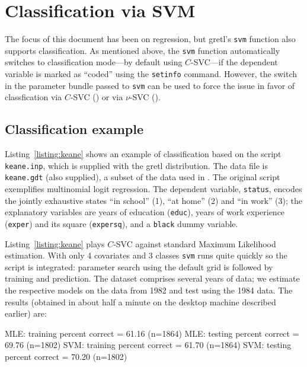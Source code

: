 \documentclass{article}
\begin{document}
\section{Classification via SVM}
\label{sec:SVC}

The focus of this document has been on regression, but gretl's
\texttt{svm} function also supports classification. As mentioned
above, the \texttt{svm} function automatically switches to
classification mode---by default using $C$-SVC---if the dependent
variable is marked as ``coded'' using the \texttt{setinfo} command.
However, the  switch in the parameter bundle passed
to \texttt{svm} can be used to force the issue in favor of
classfication via $C$-SVC () or via $\nu$-SVC
().

\subsection{Classification example}
\label{sec:SVC-example}

Listing~\ref{listing:keane} shows an example of classification based
on the script \texttt{keane.inp}, which is supplied with the gretl
distribution. The data file is \texttt{keane.gdt} (also supplied), a
subset of the data used in \cite{keane97}. The original script
exemplifies multinomial logit regression. The dependent variable,
\texttt{status}, encodes the jointly exhaustive states ``in school''
(1), ``at home'' (2) and ``in work'' (3); the explanatory variables
are years of education (\texttt{educ}), years of work experience
(\texttt{exper}) and its square (\texttt{expersq}), and a
\texttt{black} dummy variable.

Listing~\ref{listing:keane} plays $C$-SVC against standard Maximum
Likelihood estimation. With only 4 covariates and 3 classes
\texttt{svm} runs quite quickly so the script is integrated: parameter
search using the default grid is followed by training and
prediction. The dataset comprises several years of data; we estimate
the respective models on the data from 1982 and test using the 1984
data. The results (obtained in about half a minute on the desktop
machine described earlier) are:
\begin{code}
MLE: training percent correct = 61.16 (n=1864)
MLE: testing percent correct  = 69.76 (n=1802)
SVM: training percent correct = 61.70 (n=1864)
SVM: testing percent correct  = 70.20 (n=1802)
\end{code}
\end{document}
